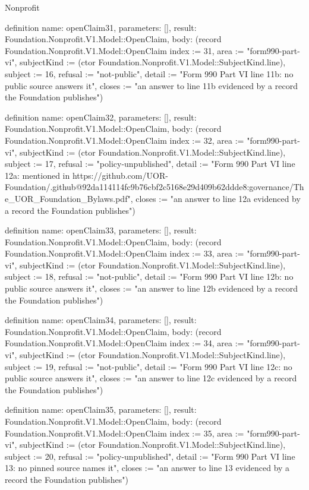 \begin{lexlean}{Nonprofit}
\begin{semanticmodule}
definition{
  name: openClaim31,
  parameters: [],
  result: Foundation.Nonprofit.V1.Model::OpenClaim,
  body: (record Foundation.Nonprofit.V1.Model::OpenClaim {index := 31, area := "form990-part-vi", subjectKind := (ctor Foundation.Nonprofit.V1.Model::SubjectKind.line), subject := 16, refusal := "not-public", detail := "Form 990 Part VI line 11b: no public source answers it", closes := "an answer to line 11b evidenced by a record the Foundation publishes"})
}

definition{
  name: openClaim32,
  parameters: [],
  result: Foundation.Nonprofit.V1.Model::OpenClaim,
  body: (record Foundation.Nonprofit.V1.Model::OpenClaim {index := 32, area := "form990-part-vi", subjectKind := (ctor Foundation.Nonprofit.V1.Model::SubjectKind.line), subject := 17, refusal := "policy-unpublished", detail := "Form 990 Part VI line 12a: mentioned in https://github.com/UOR-Foundation/.github@92da114114fc9b76cbf2c5168e29d409b62ddde8:governance/The_UOR_Foundation_Bylaws.pdf", closes := "an answer to line 12a evidenced by a record the Foundation publishes"})
}

definition{
  name: openClaim33,
  parameters: [],
  result: Foundation.Nonprofit.V1.Model::OpenClaim,
  body: (record Foundation.Nonprofit.V1.Model::OpenClaim {index := 33, area := "form990-part-vi", subjectKind := (ctor Foundation.Nonprofit.V1.Model::SubjectKind.line), subject := 18, refusal := "not-public", detail := "Form 990 Part VI line 12b: no public source answers it", closes := "an answer to line 12b evidenced by a record the Foundation publishes"})
}

definition{
  name: openClaim34,
  parameters: [],
  result: Foundation.Nonprofit.V1.Model::OpenClaim,
  body: (record Foundation.Nonprofit.V1.Model::OpenClaim {index := 34, area := "form990-part-vi", subjectKind := (ctor Foundation.Nonprofit.V1.Model::SubjectKind.line), subject := 19, refusal := "not-public", detail := "Form 990 Part VI line 12c: no public source answers it", closes := "an answer to line 12c evidenced by a record the Foundation publishes"})
}

definition{
  name: openClaim35,
  parameters: [],
  result: Foundation.Nonprofit.V1.Model::OpenClaim,
  body: (record Foundation.Nonprofit.V1.Model::OpenClaim {index := 35, area := "form990-part-vi", subjectKind := (ctor Foundation.Nonprofit.V1.Model::SubjectKind.line), subject := 20, refusal := "policy-unpublished", detail := "Form 990 Part VI line 13: no pinned source names it", closes := "an answer to line 13 evidenced by a record the Foundation publishes"})
}


\end{semanticmodule}
\end{lexlean}
